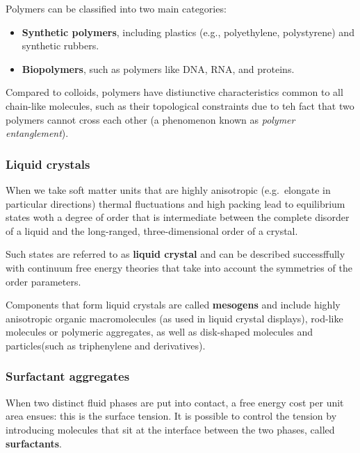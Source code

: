 \documentclass[
  letterpaper,
  enabledeprecatedfontcommands]{report}
\providecommand{\tightlist}{%
  \setlength{\itemsep}{0pt}\setlength{\parskip}{0pt}}
\begin{document}
Polymers can be classified into two main categories:

\begin{itemize}
\tightlist
\item
  \textbf{Synthetic polymers}, including plastics (e.g., polyethylene,
  polystyrene) and synthetic rubbers.
\item
  \textbf{Biopolymers}, such as polymers like DNA, RNA, and proteins.
\end{itemize}

Compared to colloids, polymers have distiunctive characteristics common
to all chain-like molecules, such as their topological constraints due
to teh fact that two polymers cannot cross each other (a phenomenon
known as \emph{polymer entanglement}).

\subsubsection*{Liquid crystals}\label{liquid-crystals}

When we take soft matter units that are highly anisotropic
(e.g.~elongate in particular directions) thermal fluctuations and high
packing lead to equilibrium states woth a degree of order that is
intermediate between the complete disorder of a liquid and the
long-ranged, three-dimensional order of a crystal.

Such states are referred to as \textbf{liquid crystal} and can be
described successffully with continuum free energy theories that take
into account the symmetries of the order parameters.

Components that form liquid crystals are called \textbf{mesogens} and
include highly anisotropic organic macromolecules (as used in liquid
crystal displays), rod-like molecules or polymeric aggregates, as well
as disk-shaped molecules and particles(such as triphenylene and
derivatives).

\subsubsection*{Surfactant aggregates}\label{surfactant-aggregates}

When two distinct fluid phases are put into contact, a free energy cost
per unit area ensues: this is the surface tension. It is possible to
control the tension by introducing molecules that sit at the interface
between the two phases, called \textbf{surfactants}.
\end{document}
